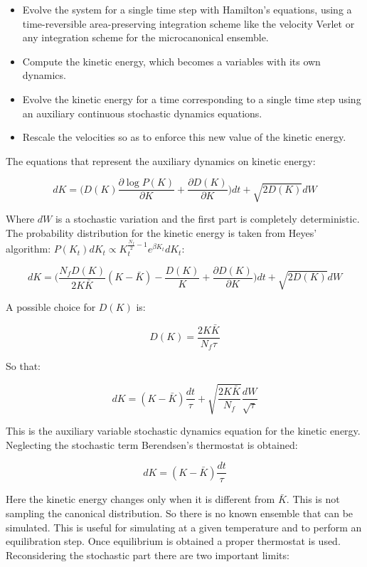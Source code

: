\begin{multicols}{2}
	\begin{itemize}
		\item Evolve the system for a single time step with Hamilton's equations, using a time-reversible area-preserving integration scheme like the velocity Verlet or any integration scheme for the microcanonical ensemble.
		\item Compute the kinetic energy, which becomes a variables with its own dynamics.
		\item Evolve the kinetic energy for a time corresponding to a single time step using an auxiliary continuous stochastic dynamics equations.
		\item Rescale the velocities so as to enforce this new value of the kinetic energy.
	\end{itemize}
\end{multicols}

The equations that represent the auxiliary dynamics on kinetic energy:

$$dK = \biggl(D(K)\frac{\partial\log P(K)}{\partial K}+\frac{\partial D(K)}{\partial K}\biggr)dt + \sqrt{2D(K)}dW$$

Where $dW$ is a stochastic variation and the first part is completely deterministic.
The probability distribution for the kinetic energy is taken from Heyes' algorithm: $P(K_t)dK_t\propto K_t^{\frac{N_f}{2}-1}e^{\beta K_t}dK_t$:

$$dK = \biggl(\frac{N_f D(K)}{2K\bar{K}}(K-\bar{K}) - \frac{D(K)}{K} + \frac{\partial D(K)}{\partial K}\biggr) dt + \sqrt{2D(K)}dW$$

A possible choice for $D(K)$ is:

$$D(K) = \frac{2K\bar{K}}{N_f\tau}$$

So that:

$$dK = (K-\bar{K})\frac{dt}{\tau}+\sqrt{\frac{2K\bar{K}}{N_f}}\frac{dW}{\sqrt{\tau}}$$

This is the auxiliary variable stochastic dynamics equation for the kinetic energy.
Neglecting the stochastic term Berendsen's thermostat is obtained:

$$dK = (K-\bar{K})\frac{dt}{\tau}$$

Here the kinetic energy changes only when it is different from $\bar{K}$.
This is not sampling the canonical distribution.
So there is no known ensemble that can be simulated.
This is useful for simulating at a given temperature and to perform an equilibration step.
Once equilibrium is obtained a proper thermostat is used.
Reconsidering the stochastic part there are two important limits:

